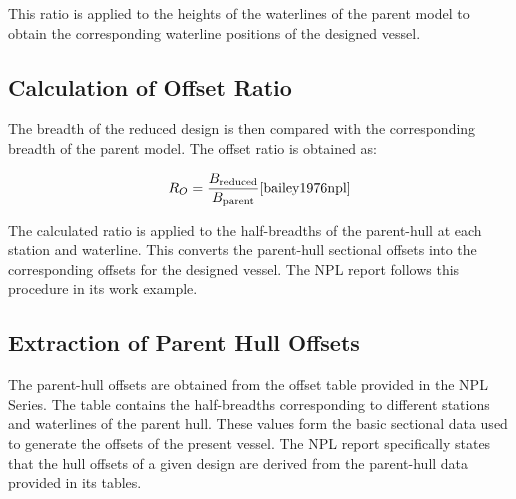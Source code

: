 \documentclass[12pt,a4paper,twoside]{report}
\begin{document}
\vspace{\baselineskip}\par\noindent This ratio is applied to the heights of the waterlines of the parent model to obtain the corresponding waterline positions of the designed vessel.
\subsection{Calculation of Offset Ratio}
The breadth of the reduced design is then compared with the corresponding breadth of the parent model. The offset ratio is obtained as:

\begin{equation}
R_{O}= \frac{B_{\text{reduced}}}{B_{\text{parent}}}\cite{bailey1976npl}
\end{equation}

\vspace{\baselineskip}\par\noindent The calculated ratio is applied to the half-breadths of the parent-hull at each station and waterline. This converts the parent-hull sectional offsets into the corresponding offsets for the designed vessel. The NPL report follows this procedure in its work example.\cite{bailey1976npl}

\subsection{Extraction of Parent Hull Offsets}
The parent-hull offsets are obtained from the offset table provided in the NPL Series. The table contains the half-breadths corresponding to different stations and waterlines of the parent hull. These values form the basic sectional data used to generate the offsets of the present vessel. The NPL report specifically states that the hull offsets of a given design are derived from the parent-hull data provided in its tables.\cite{bailey1976npl}
\end{document}
